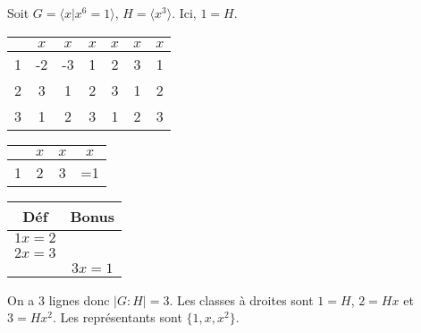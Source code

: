      \begin{ex}
       Soit $G = \langle x | x^6 = 1 \rangle$, $H = \langle x^3 \rangle$. Ici, $1 = H$.
       \begin{tabular}{c|c|c|c|c|c|c}
         & $x$ & $x$ & $x$ & $x$ & $x$ & $x$ \\
         \hline
         1 & -2 & -3 & 1 & 2 & 3 & 1\\
         \hline
         2 & 3 & 1 & 2 & 3 & 1 & 2\\
         \hline
         3 & 1 & 2 & 3 & 1 & 2 & 3
       \end{tabular}

       \begin{tabular}{c|c|c|c}
         & $x$ & $x$ & $x$ \\
         \hline
         1 & 2 & 3 & =1
       \end{tabular}

       \begin{tabular}{c|c}
         Déf & Bonus \\
         \hline
         $1x = 2$ & \\
         \hline
         $2x = 3$ & \\
         \hline
         & $3x = 1$
       \end{tabular}
       
       On a 3 lignes donc $|G:H| = 3$. Les classes à droites sont $1 = H$, $2 = Hx$ et $3 = Hx^2$. Les
       représentants sont $\{1, x, x^2\}$.
     \end{ex}


